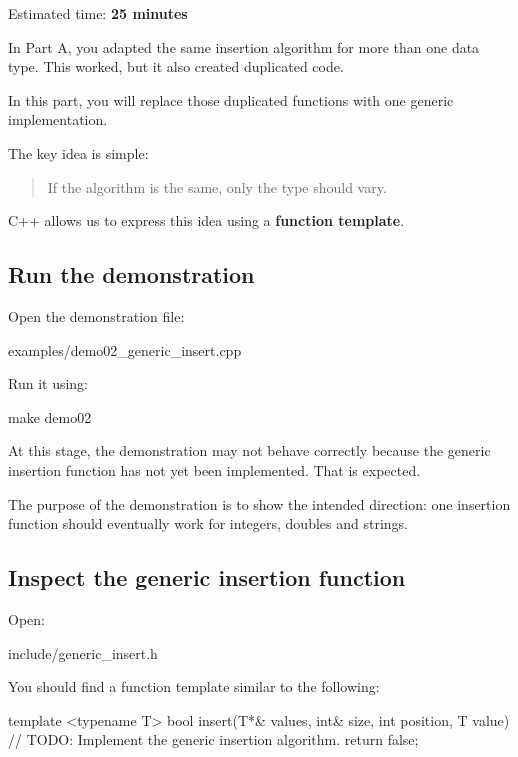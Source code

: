 \documentclass{csc2059practical}
\begin{document}
\begin{infobox}
Estimated time: \textbf{25 minutes}
\end{infobox}

In Part A, you adapted the same insertion algorithm for more than one data type. This worked, but it also created duplicated code.

In this part, you will replace those duplicated functions with one generic implementation.

The key idea is simple:

\begin{quote}
If the algorithm is the same, only the type should vary.
\end{quote}

C++ allows us to express this idea using a \textbf{function template}.

\subsection{Run the demonstration}

Open the demonstration file:

\begin{terminal}
examples/demo02_generic_insert.cpp
\end{terminal}

Run it using:

\begin{terminal}
make demo02
\end{terminal}

At this stage, the demonstration may not behave correctly because the generic insertion function has not yet been implemented. That is expected.

The purpose of the demonstration is to show the intended direction: one insertion function should eventually work for integers, doubles and strings.

\subsection{Inspect the generic insertion function}

Open:

\begin{terminal}
include/generic_insert.h
\end{terminal}

You should find a function template similar to the following:

\begin{cppcode}
template <typename T>
bool insert(T*& values, int& size, int position, T value)
{
    // TODO: Implement the generic insertion algorithm.
    return false;
}
\end{cppcode}
\end{document}
